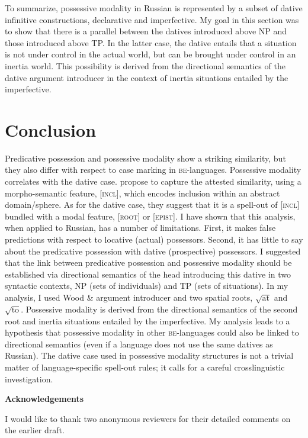 \documentclass[output=paper,colorlinks,citecolor=brown]{./langscibook}
\begin{document}
To summarize, possessive modality in Russian is represented by a subset of dative infinitive constructions, declarative and imperfective. My goal in this section was to show that there is a parallel between the datives introduced above NP and those introduced above TP. In the latter case, the dative entails that a situation is not under control in the actual world, but can be brought under control in an inertia world. This possibility is derived from the directional semantics of the dative argument introducer in the context of inertia situations entailed by the imperfective.

\section{Conclusion}\label{sec:tsedryk:5}

Predicative possession and possessive modality show a striking similarity, but they also differ with respect to case marking in \textsc{be}{}-languages. Possessive modality correlates with the dative case. \citet{BjorkmanCowper2016} propose to capture the attested similarity, using a morpho-semantic feature, [\textsc{incl}], which encodes inclusion within an abstract domain/sphere. As for the dative case, they suggest that it is a spell-out of [\textsc{incl}] bundled with a modal feature, [\textsc{root}] or [\textsc{epist}]. I have shown that this analysis, when applied to Russian, has a number of limitations. First, it makes false predictions with respect to locative (actual) possessors. Second, it has little to say about the predicative possession with dative (prospective) possessors. I suggested that the link between predicative possession and possessive modality should be established via directional semantics of the head introducing this dative in two syntactic contexts, NP (sets of individuals) and TP (sets of situations). In my analysis, I used Wood \&  argument introducer and two spatial roots,  $\sqrt{\text{at}}$  and  $\sqrt{\text{to}}$. Possessive modality is derived from the directional semantics of the second root and inertia situations entailed by the imperfective. My analysis leads to a hypothesis that possessive modality in other \textsc{be}{}-languages could also be linked to directional semantics (even if a language does not use the same datives as Russian). The dative case used in possessive modality structures is not a trivial matter of language-specific spell-out rules; it calls for a careful crosslinguistic investigation.  

\textbf{Acknowledgements}

I would like to thank two anonymous reviewers for their detailed comments on the earlier draft.

\sloppy\printbibliography[heading=subbibliography,notkeyword=this]
\end{document}
